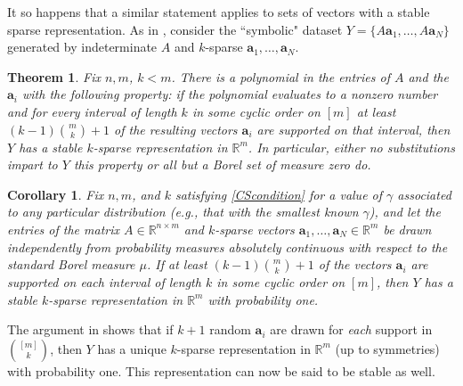 \documentclass[journal, twocolumn]{IEEEtran}
\newtheorem{theorem}{Theorem}
\newtheorem{corollary}{Corollary}
\begin{document}
It so happens that a similar statement applies to sets of vectors with a stable sparse representation. As in \cite[Sec.~IV]{Hillar15}, consider the ``symbolic" dataset $Y = \{A\mathbf{a}_1,\ldots,A \mathbf{a}_N\}$ generated by indeterminate $A$ and $k$-sparse $\mathbf{a}_1, \ldots, \mathbf{a}_N$. 
\begin{theorem}\label{robustPolythm} 
Fix $n, m$, $k < m$. There is a polynomial in the entries of $A$ and the $\mathbf{a}_i$ with the following property:  if the polynomial evaluates to a nonzero number and for every interval of length $k$ in some cyclic order on $[m]$ at least \mbox{$(k-1){m \choose k}+1$} of the resulting vectors $\mathbf{a}_i$ are supported on that interval, then $Y$ has a stable $k$-sparse representation in $\mathbb{R}^m$. In particular, either no substitutions impart to $Y$ this property or all but a Borel set of measure zero do. 
\end{theorem}


\begin{corollary}\label{ProbabilisticCor}
Fix $n, m$, and $k$ satisfying \eqref{CScondition} for a value of $\gamma$ associated to any particular distribution (e.g., that with the smallest known $\gamma$), and let the entries of the matrix $A \in \mathbb{R}^{n \times m}$ and $k$-sparse vectors $\mathbf{a}_1, \ldots, \mathbf{a}_N \in \mathbb{R}^m$ be drawn independently from probability measures absolutely continuous with respect to the standard Borel measure $\mu$. If at least $(k-1){m \choose k} + 1$ of the vectors $\mathbf{a}_i$ are supported on each interval of length $k$ in some cyclic order on $[m]$, then $Y$ has a stable $k$-sparse representation in $\mathbb{R}^m$ with probability one.
\end{corollary}

The argument in \cite{Hillar15} shows that if $k+1$ random $\mathbf{a}_i$ are drawn for \emph{each} support in ${[m] \choose k}$, then $Y$ has a unique $k$-sparse representation in $\mathbb{R}^m$ (up to symmetries) with probability one. This representation can now be said to be stable as well. %

\end{document}
